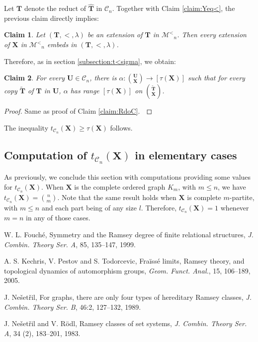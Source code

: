\documentclass[reqno]{amsart}
\newtheorem{claimm}{Claim}
\begin{document}
Let ${\textbf{{T}}}$ denote the reduct of ${\widehat{\textbf{{T}}}}$ in ${\mathcal{C}} _n$. Together with Claim \ref{claim:Yeq<}, the previous claim directly implies: 

\begin{claimm}
Let $({\textbf{{T}}}, <, \lambda)$ be an extension of ${\textbf{{T}}}$ in ${\mathcal{M}^<} _n$. Then every extension of ${\textbf{{X}}}$ in ${\mathcal{M}^<} _n$ embeds in $({\textbf{{T}}}, <, \lambda)$. 
\end{claimm}

Therefore, as in section \ref{subsection:t<sigma}, we obtain: 

\begin{claimm}
For every ${\textbf{{U}}} \in {\mathcal{C}} _n$, there is $\alpha : {{\binom{{\textbf{{U}}}}{{\textbf{{X}}}}} \longrightarrow {[\tau({\textbf{{X}}})]}}$ such that for every copy ${\widetilde{\textbf{{T}}}}$ of ${\textbf{{T}}}$ in ${\textbf{{U}}}$, $\alpha$ has range $[\tau({\textbf{{X}}})]$ on $\binom{{\widetilde{\textbf{{T}}}}}{{\textbf{{X}}}}$.   
\end{claimm}

\begin{proof} Same as proof of Claim \ref{claim:RdoC}. $\qedhere$ \end{proof}

The inequality $t_{{\mathcal{C}} _n}({\textbf{{X}}}) \geq \tau({\textbf{{X}}})$ follows. 

\subsection{Computation of $t_{{\mathcal{C}} _n}({\textbf{{X}}})$ in elementary cases}

As previously, we conclude this section with computations providing some values for $t_{{\mathcal{C}} _n}({\textbf{{X}}})$. When ${\textbf{{X}}}$ is the complete ordered graph $K_m$, with $m\leq n$, we have $t_{{\mathcal{C}} _n}({\textbf{{X}}}) = \binom{n}{m}$. Note that the same result holds when ${\textbf{{X}}}$ is complete $m$-partite, with $m\leq n$ and each part being of any size $l$. Therefore, $t_{{\mathcal{C}} _n}({\textbf{{X}}})=1$ whenever $m=n$ in any of those cases. 

\begin{thebibliography}{KPT05}

W. L. Fouch\'e, Symmetry and the Ramsey degree of finite relational structures, \emph{J. Combin. Theory Ser. A}, 85, 135--147, 1999. 

A. S. Kechris, V. Pestov and S. Todorcevic, Fra\"iss\'e limits,
Ramsey theory, and topological dynamics of automorphism groups,
\emph{Geom. Funct. Anal.}, 15, 106--189, 2005. 

J. Ne\v set\v ril, For graphs, there are only four types of hereditary Ramsey classes, \emph{J. Combin. Theory Ser. B}, 46:2, 127--132, 1989. 

J. Ne\v set\v ril and V. R\"odl, Ramsey classes of set systems, \emph{J. Combin. Theory Ser. A}, 34 (2), 183--201, 1983.

\end{thebibliography}
\end{document}
